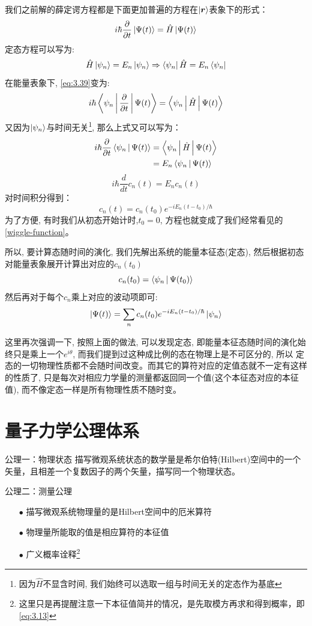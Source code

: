\documentclass[a4paper,zihao=-4,linespread=1]{ctexrep}
\newenvironment{lequation}{\large\begin{equation}}{\end{equation}}
\begin{document}
    我们之前解的薛定谔方程都是下面更加普遍的方程在$\ket{\bm{r}}$表象下的形式：
    \begin{lequation}
        \label{eq:3.39}
        i\hbar\frac{\partial}{\partial t}\ket{\Psi(t)}=\hat{H}\ket{\Psi(t)}
    \end{lequation}
    定态方程可以写为:
    \begin{lequation}
        \hat{H}\ket{\psi_n}=E_n\ket{\psi_n}\Rightarrow\bra{\psi_n}\hat{H}=E_n\bra{\psi_n}
    \end{lequation}
    在能量表象下, \ref{eq:3.39}变为:
    \[i\hbar\Braket{\psi_n|\frac{\partial}{\partial t}|\Psi(t)}=\Braket{\psi_n|\hat{H}|\Psi(t)}\]
    又因为$\ket{\psi_n}$与时间无关\footnote{因为$\hat H$不显含时间, 我们始终可以选取一组与时间无关的定态作为基底}, 那么上式又可以写为：
    \begin{align*}
        i\hbar\frac{\partial}{\partial t}\Braket{\psi_n|\Psi(t)}&=\Braket{\psi_n|\hat{H}|\Psi(t)}\\
        &=E_n\Braket{\psi_n|\Psi(t)}
    \end{align*}
    \[i\hbar\frac{d}{dt}c_n(t)=E_n c_n(t)\]
    对时间积分得到：
    \[c_n(t)=c_n(t_0)e^{-iE_n(t-t_0)/\hbar}\]
    为了方便, 有时我们从初态开始计时,$t_0=0$, 方程也就变成了我们经常看见的\ref{wiggle-function}。

    所以, 要计算态随时间的演化, 我们先解出系统的能量本征态(定态), 然后根据初态对能量表象展开计算出对应的$c_n(t_0)$
    $$c_n(t_0)=\Braket{\psi_n|\Psi(t_0)}$$
    然后再对于每个$c_n$乘上对应的波动项即可:
    \begin{equation}
        \ket{\Psi(t)}=\sum_n c_n(t_0)e^{-iE_n(t-t_0)/\hbar}\ket{\psi_n}
    \end{equation}

    这里再次强调一下, 按照上面的做法, 可以发现定态, 即能量本征态随时间的演化始终只是乘上一个$e^{i\theta}$, 而我们提到过这种成比例的态在物理上是不可区分的, 所以
    定态的一切物理性质都不会随时间改变。而其它的算符对应的定值态就不一定有这样的性质了, 只是每次对相应力学量的测量都返回同一个值(这个本征态对应的本征值), 而不像定态一样是所有物理性质不随时变。

	\section{量子力学公理体系}
	\begin{theorem}{公理一：物理状态}
		描写微观系统状态的数学量是希尔伯特(Hilbert)空间中的一个矢量，且相差一个复数因子的两个矢量，描写同一个物理状态。
	\end{theorem}
	\begin{theorem}{公理二：测量公理}
		\begin{itemize}
			\item [$\bullet$] 描写微观系统物理量的是Hilbert空间中的厄米算符
			\item [$\bullet$] 物理量所能取的值是相应算符的本征值
			\item [$\bullet$] 广义概率诠释\footnote{这里只是再提醒注意一下本征值简并的情况，是先取模方再求和得到概率，即\ref{eq:3.13}}
		\end{itemize}
	\end{theorem}
\end{document}
